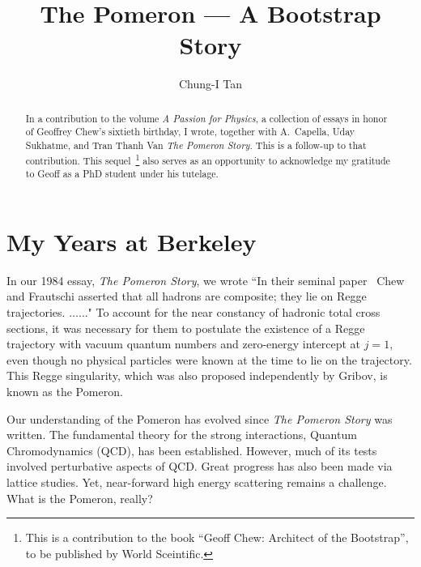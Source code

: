 \documentclass[11pt, oneside]{article}   	%
\title{The Pomeron  --- A Bootstrap Story}
\author[*]{Chung-I Tan}
\affil[*]{Brown University, Providence, RI 02912}
\newcommand{\<}{\langle}
\renewcommand{\>}{\rangle}
\numberwithin{equation}{section}
\numberwithin{figure}{section}
\begin{document}
\maketitle



\begin{abstract}
In a contribution to the volume {\it A Passion for Physics},  a collection of essays in honor of Geoffrey Chew's sixtieth birthday, I wrote, together with A.~Capella, Uday Sukhatme, and Tran Thanh Van {\it The Pomeron Story.}  This is a follow-up to that contribution.  This sequel~\footnote{This is a contribution to the book ``Geoff Chew: Architect of the Bootstrap'', to be published by World Sceintific.} also serves as an opportunity to acknowledge my gratitude to Geoff as a PhD student under his tutelage.
\end{abstract}
\setlength{\parskip}{.1in}
\maketitle

{}

\section{My Years at Berkeley}
In our 1984 essay, {\it The Pomeron Story}, we wrote ``In their seminal paper~\cite{Chew:1962eu} Chew and Frautschi asserted that all hadrons are composite; they lie on Regge trajectories.  $\ldots\ldots$"   To account for the near constancy of hadronic total cross sections, it was necessary for them to postulate the existence of a Regge trajectory with vacuum quantum numbers and zero-energy intercept at $j=1$,  even though no physical particles were known at the time to lie on the trajectory. This Regge singularity, which was also proposed independently by Gribov, is known as the Pomeron. 

 \font=2.79pt
 Our understanding of the Pomeron has evolved since {\it The Pomeron Story} was written. The fundamental theory for the strong interactions, Quantum Chromodynamics (QCD),  has been established. However, much of its tests involved perturbative aspects of QCD. 
 Great progress has also been made via lattice studies. Yet,  near-forward high energy scattering %
 remains  a challenge.  What is the Pomeron, really?
\font=3.5pt 
\end{document}

